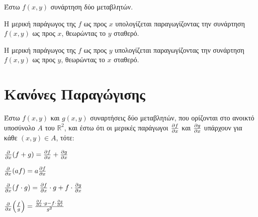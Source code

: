 Έστω $ f(x,y) $ συνάρτηση δύο μεταβλητών. 
\begin{myitemize}
  \item Η μερική παράγωγος της $f$ ως προς $x$ υπολογίζεται παραγωγίζοντας 
    την συνάρτηση $ f(x,y) $ ως προς $x$, θεωρώντας το $y$ σταθερό. 
  \item Η μερική παράγωγος της $f$ ως προς $y$ υπολογίζεται παραγωγίζοντας 
    την συνάρτηση $ f(x,y) $ ως προς $y$, θεωρώντας το $x$ σταθερό. 
\end{myitemize}

\section{Κανόνες Παραγώγισης}

Έστω $ f(x,y) $ και $ g(x,y) $ συναρτήσεις δύο μεταβλητών, που ορίζονται στο 
ανοικτό υποσύνολο $ A $ του $ \mathbb{R}^{2} $, και έστω ότι οι μερικές παράγωγοι 
$ \pdv{f}{x} $ και $ \pdv{g}{x} $ υπάρχουν για κάθε $ (x,y) \in A $, τότε:
\begin{myitemize}
  \item $ \pdv{x}(f+g) = \pdv{f}{x} + \pdv{g}{x} $
  \item $ \pdv{x}(af) = a \pdv{f}{x} $ 
  \item $ \pdv{x}(f\cdot g) = \pdv{f}{x} \cdot g + f \cdot \pdv{g}{x} $
  \item $ \pdv{x}(\frac{f}{g}) = \frac{\pdv{f}{x} \cdot g - f \cdot 
    \pdv{g}{x}}{g^{2}} $
\end{myitemize}

